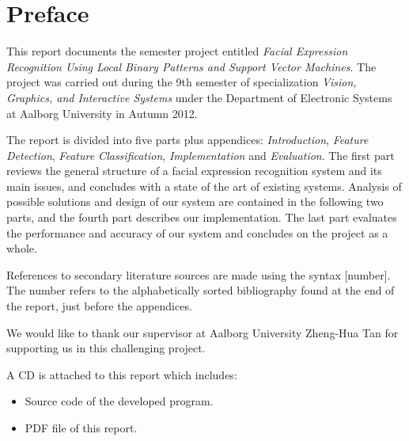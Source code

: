 \thispagestyle{plain}
\hypersetup{bookmarksdepth=-2} %
\chapter*{Preface}
\hypersetup{bookmarksdepth}%

\noindent This report documents the semester project entitled \textit{Facial Expression Recognition Using Local Binary Patterns and Support Vector Machines}. The project was carried out during the 9th semester of specialization \textit{Vision, Graphics, and Interactive Systems} under the Department of Electronic Systems at Aalborg University in Autumn 2012. 
\newline

\noindent The report is divided into five parts plus appendices: \textit{Introduction}, \textit{Feature Detection}, \textit{Feature Classification}, \textit{Implementation} and \textit{Evaluation}. The first part reviews the general structure of a facial expression recognition system and its main issues, and concludes with a state of the art of existing systems. Analysis of possible solutions and design of our system are contained in the following two parts, and the fourth part describes our implementation. The last part evaluates the performance and accuracy of our system and concludes on the project as a whole. 
\newline

\noindent References to secondary literature sources are made using the syntax [number]. The number refers to the alphabetically sorted bibliography found at the end of the report, just before the appendices.
\newline

\noindent We would like to thank our supervisor at Aalborg University Zheng-Hua Tan for supporting us in this challenging project. 
\newline

\noindent A CD is attached to this report which includes:
\begin{itemize}
\item Source code of the developed program.
\item PDF file of this report.
\end{itemize}

